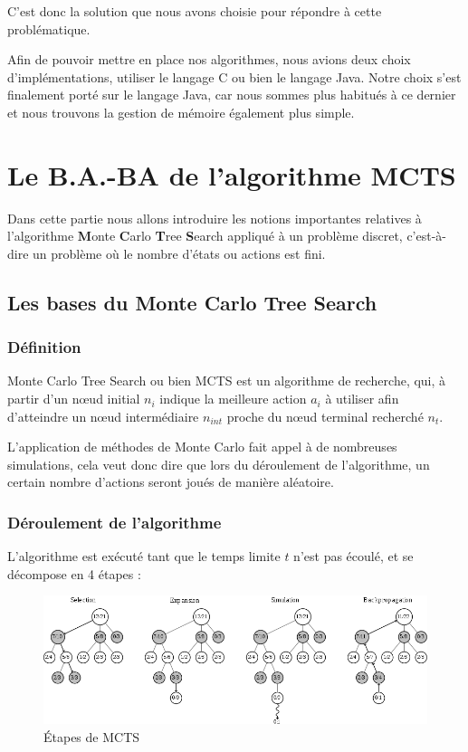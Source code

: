 \documentclass[pdftex,french, english]{article}	%
\begin{document}
	C'est donc la solution que nous avons choisie pour répondre à cette problématique. 

	Afin de pouvoir mettre en place nos algorithmes, nous avions deux choix d'implémentations, utiliser le langage C ou bien le langage Java. 
	Notre choix s'est finalement porté sur le langage Java, car nous sommes plus habitués à ce dernier et nous trouvons la gestion de mémoire également plus simple.

\section{Le B.A.-BA de l'algorithme MCTS}

	Dans cette partie nous allons introduire les notions importantes relatives à l'algorithme \textbf{M}onte \textbf{C}arlo \textbf{T}ree \textbf{S}earch \cite{coulom01}
	appliqué à un problème discret, c'est-à-dire un problème où le nombre d'états ou actions est fini.

	\subsection{Les bases du Monte Carlo Tree Search}
	\subsubsection{Définition}
	Monte Carlo Tree Search ou bien MCTS est un algorithme de recherche, qui, à partir d'un nœud initial $n_{i}$ indique la meilleure action $a_i$ à utiliser afin d'atteindre un nœud intermédiaire $n_{int}$ proche du nœud terminal recherché $n_{t}$. 

	L'application de méthodes de Monte Carlo fait appel à de nombreuses simulations, cela veut donc dire que lors du déroulement de l'algorithme, un certain nombre d'actions seront joués de manière aléatoire.
	\subsubsection{Déroulement de l'algorithme}
	L'algorithme est exécuté tant que le temps limite $t$ n'est pas écoulé, et se décompose en 4 étapes :
	\begin{figure}[h]
		\centering
		\includegraphics[width=\textwidth]{etapes.png}
		\caption{ Étapes de MCTS}
		 \label{fig:mcts}
	\end{figure}
\end{document}
